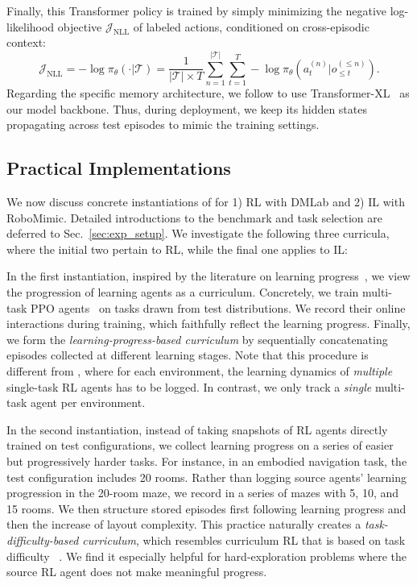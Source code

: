 Finally, this Transformer policy is trained by simply minimizing the negative log-likelihood objective $\mathcal{J}_{\text{NLL}}$ of labeled actions, conditioned on cross-episodic context:
\begin{equation}
    \mathcal{J}_{\text{NLL}} =   - \log \pi_\theta (\cdot \vert \mathcal{T}) = \frac{1}{\vert \mathcal{T} \vert \times T} \sum_{n = 1}^{\vert \mathcal{T} \vert} \sum_{t = 1}^T - \log \pi_\theta \left(a_t^{(n)} \vert  o_{\leq t}^{(\leq n)} \right).
\end{equation}
Regarding the specific memory architecture, we follow \citet{openai2022vpt,team2023humantimescale} to use Transformer-XL~\citep{dai2019transformerxl} as our model backbone. Thus, during deployment, we keep its hidden states propagating across test episodes to mimic the training settings.

\subsection{Practical Implementations}
We now discuss concrete instantiations of \cec for 1) RL with DMLab and 2) IL with RoboMimic.
Detailed introductions to the benchmark and task selection are deferred to Sec.~\ref{sec:exp_setup}.
We investigate the following three curricula, where the initial two pertain to RL, while the final one applies to IL:

In the first instantiation, inspired by the literature on learning progress~\citep{matiisen2017teacherstudent,graves2017automated,portelas2019teacher,kanitscheider2021multitask}, we view the progression of learning agents as a curriculum.
Concretely, we train multi-task PPO agents~\citep{schulman2017proximal,petrenko2020sample} on tasks drawn from test distributions.
We record their online interactions during training, which faithfully reflect the learning progress.
Finally, we form the \textit{learning-progress-based curriculum} by sequentially concatenating episodes collected at different learning stages.
Note that this procedure is different from \citet{laskin2023incontext}, where for each environment, the learning dynamics of \emph{multiple} single-task RL agents has to be logged. In contrast, we only track a \emph{single} multi-task agent per environment.


 In the second instantiation, instead of taking snapshots of RL agents directly trained on test configurations, we collect learning progress on a series of easier but progressively harder tasks. For instance, in an embodied navigation task, the test configuration includes 20 rooms. Rather than logging source agents' learning progression in the 20-room maze, we record in a series of mazes with 5, 10, and 15 rooms. We then structure stored episodes first following learning progress and then the increase of layout complexity. This practice naturally creates a \textit{task-difficulty-based curriculum}, which resembles curriculum RL that is based on task difficulty ~\citep{matiisen2017teacherstudent,Narvekar2017AutonomousTS}.
We find it especially helpful for hard-exploration problems where the source RL agent does not make meaningful progress.

